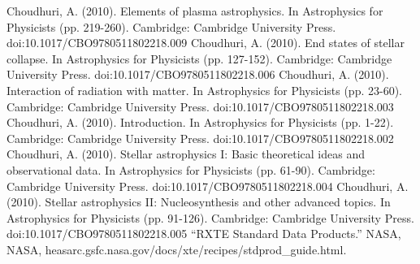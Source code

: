 \documentclass[a4paper,twoside]{report}
\numberwithin{equation}{section}
\begin{document}
\begin{thebibliography}{20}
Choudhuri, A. (2010). Elements of plasma astrophysics. In Astrophysics for Physicists (pp. 219-260). Cambridge: Cambridge University Press. doi:10.1017/CBO9780511802218.009
Choudhuri, A. (2010). End states of stellar collapse. In Astrophysics for Physicists (pp. 127-152). Cambridge: Cambridge University Press. doi:10.1017/CBO9780511802218.006
Choudhuri, A. (2010). Interaction of radiation with matter. In Astrophysics for Physicists (pp. 23-60). Cambridge: Cambridge University Press. doi:10.1017/CBO9780511802218.003
Choudhuri, A. (2010). Introduction. In Astrophysics for Physicists (pp. 1-22). Cambridge: Cambridge University Press. doi:10.1017/CBO9780511802218.002
Choudhuri, A. (2010). Stellar astrophysics I: Basic theoretical ideas and observational data. In Astrophysics for Physicists (pp. 61-90). Cambridge: Cambridge University Press. doi:10.1017/CBO9780511802218.004
Choudhuri, A. (2010). Stellar astrophysics II: Nucleosynthesis and other advanced topics. In Astrophysics for Physicists (pp. 91-126). Cambridge: Cambridge University Press. doi:10.1017/CBO9780511802218.005
“RXTE Standard Data Products.” NASA, NASA, heasarc.gsfc.nasa.gov/docs/xte/recipes/stdprod\_guide.html.
  	

\end{thebibliography}
\end{document}
